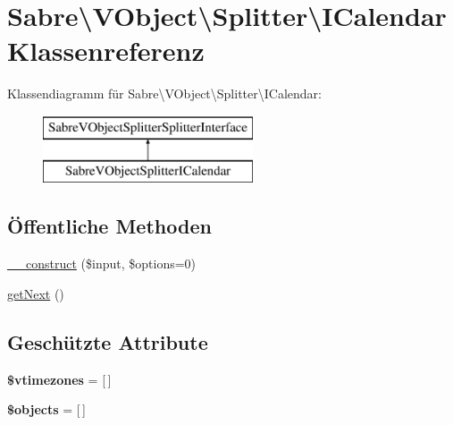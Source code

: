 \hypertarget{class_sabre_1_1_v_object_1_1_splitter_1_1_i_calendar}{}\section{Sabre\textbackslash{}V\+Object\textbackslash{}Splitter\textbackslash{}I\+Calendar Klassenreferenz}
\label{class_sabre_1_1_v_object_1_1_splitter_1_1_i_calendar}
Klassendiagramm für Sabre\textbackslash{}V\+Object\textbackslash{}Splitter\textbackslash{}I\+Calendar\+:\begin{figure}[H]
\begin{center}
\leavevmode
\includegraphics[height=2.000000cm]{class_sabre_1_1_v_object_1_1_splitter_1_1_i_calendar}
\end{center}
\end{figure}
\subsection*{Öffentliche Methoden}
\begin{DoxyCompactItemize}
\item 
\mbox{\hyperlink{class_sabre_1_1_v_object_1_1_splitter_1_1_i_calendar_ae57dda55b32775772e856b140468df06}{\+\_\+\+\_\+construct}} (\$input, \$options=0)
\item 
\mbox{\hyperlink{class_sabre_1_1_v_object_1_1_splitter_1_1_i_calendar_a966d8ca4940e9327a203ea5e4e1cf101}{get\+Next}} ()
\end{DoxyCompactItemize}
\subsection*{Geschützte Attribute}
\begin{DoxyCompactItemize}
\item 
\mbox{\label{class_sabre_1_1_v_object_1_1_splitter_1_1_i_calendar_abc2101762f731ae79e7645a388f9c53d}} 
{\bfseries \$vtimezones} = \mbox{[}$\,$\mbox{]}
\item 
\mbox{\label{class_sabre_1_1_v_object_1_1_splitter_1_1_i_calendar_abc29065cfb8d12d5a7f3f37f30e45183}} 
{\bfseries \$objects} = \mbox{[}$\,$\mbox{]}
\end{DoxyCompactItemize}


